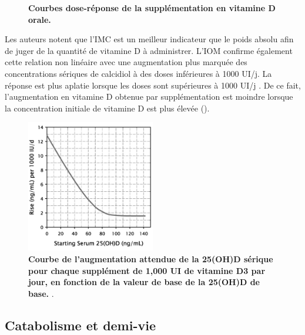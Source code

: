 \documentclass[
  a4paper,
  DIV=11,
  numbers=noendperiod,
  listof=totoc]{scrreprt}
\begin{document}
\begin{figure}[H]
\begin{subfigure}{0.48\textwidth}
        \label{subfig:vd-dose-imc}
    \end{subfigure}
    \caption[Courbes dose-réponse de la supplémentation en vitamine D orale.]{\textbf{Courbes dose-réponse de la supplémentation en vitamine D orale.}}
    \label{fig:dose-response}
\end{figure}

Les auteurs notent que l'\ac{IMC} est un meilleur indicateur que le
poids absolu afin de juger de la quantité de vitamine D à administrer.
L'\ac{IOM} confirme également cette relation non linéaire avec une
augmentation plus marquée des concentrations sériques de calcidiol à des
doses inférieures à 1000 UI/j. La réponse est plus aplatie lorsque les
doses sont supérieures à 1000 UI/j \autocite{IOM.2011,Garland.2011}. De
ce fait, l'augmentation en vitamine D obtenue par supplémentation est
moindre lorsque la concentration initiale de vitamine D est plus élevée
().

\begin{figure}[H]
\centering
\includegraphics[width=0.5\textwidth]{figures/vd-expected-rise.jpeg}
\caption[Courbe de l'augmentation attendue de la 25(OH)D sérique pour chaque supplément de 1,000 UI de vitamine D3 par jour, en fonction de la valeur de base de la 25(OH)D de base]{\textbf{Courbe de l'augmentation attendue de la 25(OH)D sérique pour chaque supplément de 1,000 UI de vitamine D3 par jour, en fonction de la valeur de base de la 25(OH)D de base.} \autocite{Garland.2011}.}
\label{fig:vd-expected-rise}
\end{figure}

\subsection{Catabolisme et demi-vie}\label{catabolisme-et-demi-vie}
\end{document}
